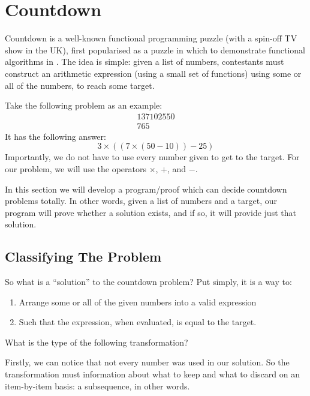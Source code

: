 \chapter{Countdown}
Countdown is a well-known functional programming puzzle (with a spin-off TV show
in the UK), first popularised as a puzzle in which to demonstrate functional
algorithms in \cite{huttonCountdownProblem2002}.
The idea is simple: given a list of numbers, contestants must construct an
arithmetic expression (using a small set of functions) using some or all of the
numbers, to reach some target.

Take the following problem as an example:
\begin{gather*}
  \boxed{1} \boxed{3} \boxed{7} \boxed{10} \boxed{25} \boxed{50} \\
  \boxed{765} \tag{Target}
\end{gather*}
It has the following answer:
\begin{equation}
  3 \times ((7 \times (50 - 10)) - 25)
\end{equation}
Importantly, we do not have to use every number given to get to the target.
For our problem, we will use the operators \(\times\), \(+\), and \(-\).

In this section we will develop a program/proof which can decide countdown
problems totally.
In other words, given a list of numbers and a target, our program will prove
whether a solution exists, and if so, it will provide just that solution.
\section{Classifying The Problem}
So what is a ``solution'' to the countdown problem?
Put simply, it is a way to:
\begin{enumerate}
  \item Arrange some or all of the given numbers into a valid expression
  \item Such that the expression, when evaluated, is equal to the target.
\end{enumerate}


What is the type of the following transformation?

Firstly, we can notice that not every number was used in our solution.
So the transformation must information about what to keep and what to discard on
an item-by-item basis: a subsequence, in other words.



